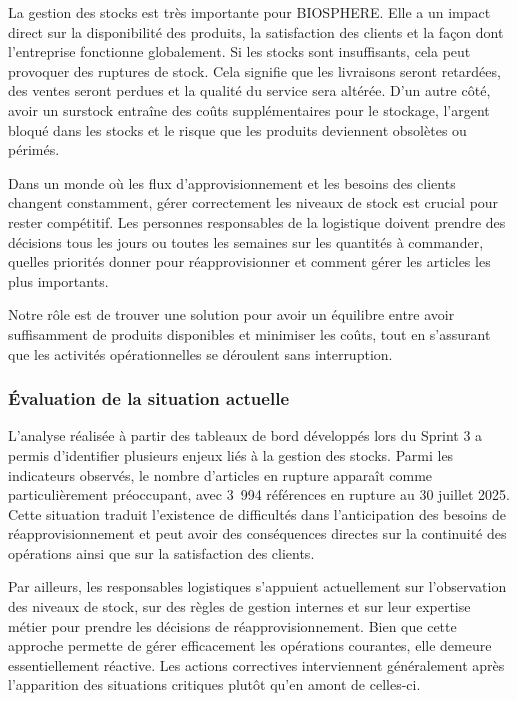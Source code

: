 La gestion des stocks est très importante pour BIOSPHERE. Elle a un impact direct sur la disponibilité des produits, la satisfaction des clients et la façon dont l'entreprise fonctionne globalement. Si les stocks sont insuffisants, cela peut provoquer des ruptures de stock. Cela signifie que les livraisons seront retardées, des ventes seront perdues et la qualité du service sera altérée. D'un autre côté, avoir un surstock entraîne des coûts supplémentaires pour le stockage, l'argent bloqué dans les stocks et le risque que les produits deviennent obsolètes ou périmés.
 
Dans un monde où les flux d'approvisionnement et les besoins des clients changent constamment, gérer correctement les niveaux de stock est crucial pour rester compétitif. Les personnes responsables de la logistique doivent prendre des décisions tous les jours ou toutes les semaines sur les quantités à commander, quelles priorités donner pour réapprovisionner et comment gérer les articles les plus importants.
 
Notre rôle est de trouver une solution pour avoir un équilibre entre avoir suffisamment de produits disponibles et minimiser les coûts, tout en s'assurant que les activités opérationnelles se déroulent sans interruption.
 
\subsubsection{Évaluation de la situation actuelle}
 
L'analyse réalisée à partir des tableaux de bord développés lors du Sprint 3 a permis d'identifier plusieurs enjeux liés à la gestion des stocks. Parmi les indicateurs observés, le nombre d'articles en rupture apparaît comme particulièrement préoccupant, avec 3~994 références en rupture au 30 juillet 2025. Cette situation traduit l'existence de difficultés dans l'anticipation des besoins de réapprovisionnement et peut avoir des conséquences directes sur la continuité des opérations ainsi que sur la satisfaction des clients.
 
Par ailleurs, les responsables logistiques s'appuient actuellement sur l'observation des niveaux de stock, sur des règles de gestion internes et sur leur expertise métier pour prendre les décisions de réapprovisionnement. Bien que cette approche permette de gérer efficacement les opérations courantes, elle demeure essentiellement réactive. Les actions correctives interviennent généralement après l'apparition des situations critiques plutôt qu'en amont de celles-ci.
 
